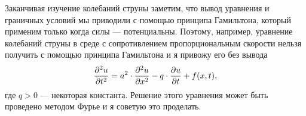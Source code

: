 Заканчивая изучение колебаний струны заметим, что вывод уравнения и граничных условий мы приводили с помощью принципа Гамильтона, который применим только когда силы --- потенциальны. Поэтому, например, уравнение колебаний струны в среде с сопротивлением пропорциональным скорости нельзя получить с помощью принципа Гамильтона и я привожу его без вывода
\begin{equation*}
	\frac{\partial^2u}{\partial t^2}=a^2\cdot\frac{\partial^2u}{\partial x^2}-q\cdot\frac{\partial u}{\partial t}+f(x,t),
\end{equation*} 
где $q>0$ --- некоторая константа. Решение этого уравнения может быть проведено методом Фурье и я советую это проделать.